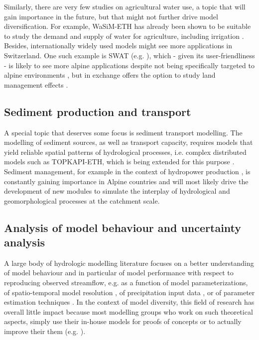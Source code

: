 \documentclass[10pt,a4paper]{article}
\begin{document}
Similarly, there are very few studies on agricultural water use, a topic
that will gain importance in the future, but that might not further
drive model diversification. For example, WaSiM-ETH has already been
shown to be suitable to study the demand and supply of water for
agriculture, including irrigation \citep{Fuhrer2012}. Besides,
internationally widely used models might see more applications in
Switzerland. One such example is SWAT (e.g. \citealt{Abbaspour2007} ), which
- given its user-friendliness - is likely to see more alpine
applications despite not being specifically targeted to alpine
environments \citep{Andrianaki2019}, but in exchange offers the option to
study land management effects \citep{Zarrineh2018}.

\subsection{Sediment production and transport}
\label{sec:application:sediment}

A special topic that deserves some focus is sediment transport
modelling. The modelling of sediment sources, as well as transport
capacity, requires models that yield reliable spatial patterns of
hydrological processes, i.e. complex distributed models such as
TOPKAPI-ETH, which is being extended for this
purpose \citep{Konz_2011,Battista2020}. Sediment management, for example in the
context of hydropower production \citep{RaymondPralong2015,Gabbud2015}, is constantly
gaining importance in Alpine countries and will most likely drive the
development of new modules to simulate the interplay of hydrological and
geomorphological processes at the catchment scale.

\subsection{Analysis of model behaviour and uncertainty analysis}
\label{sec:application:uncertainty}

A large body of hydrologic modelling literature focuses on a better
understanding of model behaviour and in particular of model performance
with respect to reproducing observed streamflow, e.g. as a function of
model parameterizations, of spatio-temporal model resolution
\citep{Brunner_2019}, of precipitation input data \citep{Sikorska2016,Muller-Thomy2019}, 
or of parameter estimation techniques \citep{Foglia_2009}. In the
context of model diversity, this field of research has overall little
impact because most modelling groups who work on such theoretical
aspects, simply use their in-house models for proofs of concepts or to
actually improve their them (e.g. \citealt{Schaefli2007,Hingray2010}).
\end{document}
